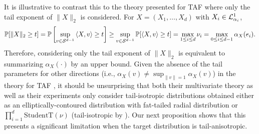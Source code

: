 \documentclass{article}
\theoremstyle{definition}
\theoremstyle{remark}
\begin{document}






It is illustrative to contrast this to the theory presented for TAF \citep{jaini2020tails}
where only the tail exponent of $\|X\|_2$ is considered.
For $X = (X_1, \ldots, X_d)$ with $X_i \in \mathcal{L}^1_{\alpha_i}$, 
\begin{align*}
  \mathbb{P}[\|X\|_2 \geq t]
  = \mathbb{P}\left[\sup_{v \in \mathcal{S}^{d-1}} \braket{X,v} \geq t\right]
  \geq \sup_{v \in \mathcal{S}^{d-1}} \mathbb{P}[\braket{X,v} \geq t]
  = \max_{1 \leq i \leq d} \nu_i
  = \max_{0 \leq i \leq d-1} \alpha_X(e_i).
\end{align*}
Therefore, considering only the tail exponent of $\|X\|_2$ is equivalent to summarizing $\alpha_X(\cdot)$ by an upper bound.
Given the absence of the tail parameters for other directions (i.e., $\alpha_X(v) \neq \sup_{\|v\|=1} \alpha_X(v)$)
in the theory for TAF \citep{jaini2020tails}, it should be unsurprising that both their multivariate 
theory as well as their experiments only consider tail-isotropic distributions obtained either
as an elliptically-contoured distribution with fat-tailed radial distribution or 
$\prod_{i=1}^d \text{StudentT}(\nu)$ (tail-isotropic by ). 
Our next proposition shows that this presents a significant limitation when the target distribution is
tail-anisotropic.
\end{document}

